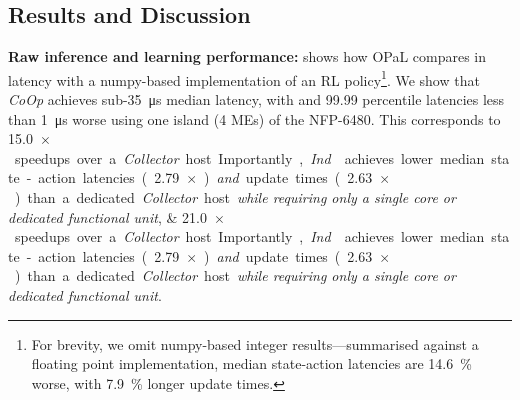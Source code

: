 \documentclass[
sigconf,natbib=false
]{acmart}
\newcommand{\fakepara}[1]{\noindent\textbf{#1:}}
\newcommand{\approachshort}{OPaL}
\newcommand{\Coopfw}{\emph{CoOp}}
\newcommand{\Indfw}{\emph{Ind}}
\begin{document}
\subsection{Results and Discussion}\label{sec:results}
\fakepara{Raw inference and learning performance}
 shows how \approachshort{} compares in latency with a numpy-based implementation of an RL policy\footnote{For brevity, we omit numpy-based integer results---summarised against a floating point implementation, median state-action latencies are \SI{14.6}{\percent} worse, with \SI{7.9}{\percent} longer update times.}.
We show that \Coopfw{} achieves sub-\SI{35}{\micro\second} median latency, with  and \num{99.99} percentile latencies less than \SI{1}{\micro\second} worse using one island (4 MEs) of the NFP-6480.
This corresponds to \SIlist{15.0;21.0}{$\times$} speedups over a \emph{Collector} host.
Importantly, \Indfw{} achieves lower median state-action latencies (\SI{2.79}{$\times$}) \emph{and} update times (\SI{2.63}{$\times$}) than a dedicated \emph{Collector} host \emph{while requiring only a single core or dedicated functional unit}.

\begin{table}
	\caption{Latencies and computation times for \approachshort{} versus commodity hardware hosts. On-device execution is crucial in not only lowering latencies, but in reducing tail latencies. Lower is better, with the best marked \emph{in bold}.\label{tab:lats}}
\end{table}

\begin{table}
	\caption{Action and update throughputs for \approachshort{} versus commodity hardware hosts. Most designs cannot scale online performance with additional cores. Higher is better, with the best marked \emph{in bold}.\label{tab:tputs}}
\end{table}
\end{document}
